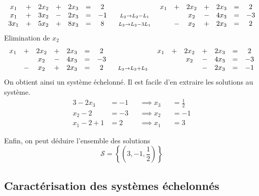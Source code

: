 \documentclass[12pt,a4paper]{article}
\begin{document}
\[
\begin{array}{ccccccc}
x_1&+&2x_2&+&2x_3&=&2\\
x_1&+&3x_2&-&2x_3&=&-1\\
3x_1&+&5x_2&+&8x_3&=&8\\
\end{array}
~
\begin{array}{c}
\\
~
\mathsmaller{L_2 \rightarrow L_2 - L_1} \\
~
\mathsmaller{L_3 \rightarrow L_3 - 3L_1}
\end{array}
~
\begin{array}{ccccccc}
x_1&+&2x_2&+&2x_3&=&2\\
&&x_2&-&4x_3&=&-3\\
&-&x_2&+&2x_3&=&2\\
\end{array}
\]
Elimination de \(x_2\)
\[
\begin{array}{ccccccc}
x_1&+&2x_2&+&2x_3&=&2\\
&&x_2&-&4x_3&=&-3\\
&-&x_2&+&2x_3&=&2\\
\end{array}
~
\begin{array}{c}
\\
~
\\
~
\mathsmaller{L_3 \rightarrow L_3 + L_2}
\end{array}
~
\begin{array}{ccccccc}
x_1&+&2x_2&+&2x_3&=&2\\
&&x_2&-&4x_3&=&-3\\
&&&-&2x_3&=&-1\\
\end{array}
\]
On obtient ainsi un système échelonné. Il est facile d'en extraire les solutions au système.
\begin{alignat*}{3}
  -2x_3& = -1 && \implies x_3 && = \frac{1}{2} \\
  x_2 - 2& = -3 && \implies x_2 && = -1 \\
  x_1 - 2 + 1& = 2 && \implies x_1 && = 3
\end{alignat*}

Enfin, on peut déduire l'ensemble des solutions
$$ \mathcal{S} = \left\{ \left(3,-1,\frac{1}{2}\right)\right\}$$
\newpage
\subsection{Caractérisation des systèmes échelonnés}
\end{document}
